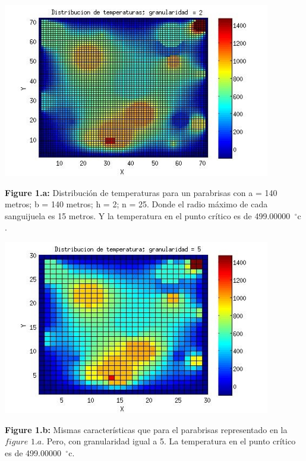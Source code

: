 \includegraphics[width=\textwidth,height=3.0in,keepaspectratio
]{140x140h2.jpg} \newline
\begin {flushleft}
\textbf{Figure 1.a:} Distribución de temperaturas para un parabrisas con a = 140 metros; b = 140 metros; h = 2; n = 25. Donde el radio máximo de cada sanguijuela es 15 metros. Y la temperatura en el punto crítico es de 499.00000\hspace{-1.5mm}$\phantom{a}^{\circ}$c .
\end{flushleft}

\includegraphics[width=\textwidth,height=3.0in,keepaspectratio
]{140x140h5.jpg} \newline
\begin {flushleft}
\textbf{Figure 1.b:} Mismas características que para el parabrisas representado en la $figure$ $1.a$. Pero, con granularidad igual a 5. La temperatura en el punto crítico es de 499.00000\hspace{-1.5mm}$\phantom{a}^{\circ}$c.
\end{flushleft}


